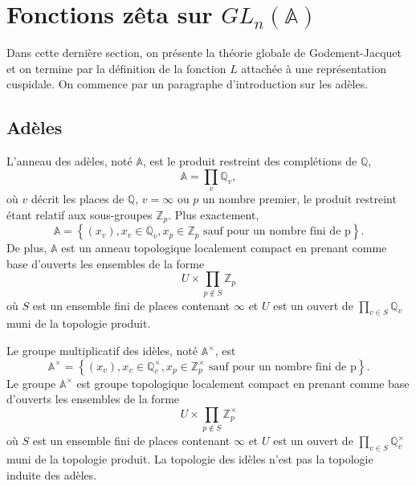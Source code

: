 \section{Fonctions zêta sur $GL_n(\mathbb{A})$}

Dans cette dernière section, on présente la théorie globale de Godement-Jacquet \cite{godement-jacquet} et on termine par la définition de la fonction $L$ attachée à une représentation cuspidale. On commence par un paragraphe d'introduction sur les adèles.

\subsection{Adèles}

L'anneau des adèles, noté $\mathbb{A}$, est le produit restreint des complétions de $\mathbb{Q}$,
\begin{equation}
\mathbb{A} = \prod_v \mathbb{Q}_v,
\end{equation}
où $v$ décrit les places de $\mathbb{Q}$, $v = \infty$ ou $p$ un nombre premier, le produit restreint étant relatif aux sous-groupes $\mathbb{Z}_p$. Plus exactement,
\begin{equation}
\mathbb{A} = \left\lbrace (x_v), x_v \in \mathbb{Q}_v, x_p \in \mathbb{Z}_p \text{ sauf pour un nombre fini de p} \right\rbrace.
\end{equation}
De plus, $\mathbb{A}$ est un anneau topologique localement compact en prenant comme base d'ouverts les ensembles de la forme
\begin{equation}
U \times \prod_{p \not\in S} \mathbb{Z}_p
\end{equation}
où $S$ est un ensemble fini de places contenant $\infty$ et $U$ est un ouvert de $\prod_{v \in S} \mathbb{Q}_v$ muni de la topologie produit.

Le groupe multiplicatif des idèles, noté $\mathbb{A}^\times$, est
\begin{equation}
\mathbb{A}^\times = \left\lbrace (x_v), x_v \in \mathbb{Q}_v^\times, x_p \in \mathbb{Z}_p^\times \text{ sauf pour un nombre fini de p} \right\rbrace.
\end{equation}
Le groupe $\mathbb{A}^\times$ est groupe topologique localement compact en prenant comme base d'ouverts les ensembles de la forme
\begin{equation}
U \times \prod_{p \not\in S} \mathbb{Z}_p^\times
\end{equation}
où $S$ est un ensemble fini de places contenant $\infty$ et $U$ est un ouvert de $\prod_{v \in S} \mathbb{Q}_v^\times$ muni de la topologie produit. La topologie des idèles n'est pas la topologie induite des adèles.

